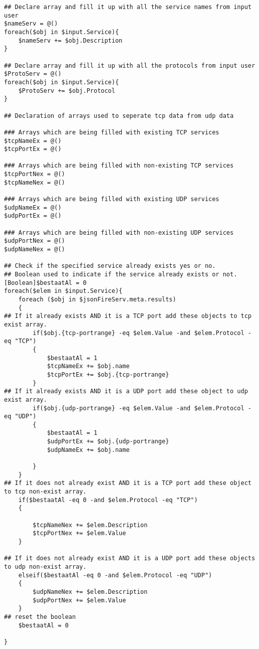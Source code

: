 \documentclass[dutch,dit,thesis]{hogentreport}
\begin{document}
\begin{lstlisting}[caption={main.ps1 Powershell script}]
## Declare array and fill it up with all the service names from input user
$nameServ = @()
foreach($obj in $input.Service){
    $nameServ += $obj.Description
}

## Declare array and fill it up with all the protocols from input user
$ProtoServ = @()
foreach($obj in $input.Service){
    $ProtoServ += $obj.Protocol
}

## Declaration of arrays used to seperate tcp data from udp data

### Arrays which are being filled with existing TCP services 
$tcpNameEx = @()
$tcpPortEx = @()

### Arrays which are being filled with non-existing TCP services
$tcpPortNex = @()
$tcpNameNex = @()

### Arrays which are being filled with existing UDP services
$udpNameEx = @()
$udpPortEx = @()

### Arrays which are being filled with non-existing UDP services
$udpPortNex = @()
$udpNameNex = @()

## Check if the specified service already exists yes or no. 
## Boolean used to indicate if the service already exists or not.
[Boolean]$bestaatAl = 0
foreach($elem in $input.Service){
    foreach ($obj in $jsonFireServ.meta.results)
    {
## If it already exists AND it is a TCP port add these objects to tcp exist array. 
        if($obj.{tcp-portrange} -eq $elem.Value -and $elem.Protocol -eq "TCP")
        {
            $bestaatAl = 1
            $tcpNameEx += $obj.name
            $tcpPortEx += $obj.{tcp-portrange}
        }
## If it already exists AND it is a UDP port add these object to udp exist array.
        if($obj.{udp-portrange} -eq $elem.Value -and $elem.Protocol -eq "UDP")
        {
            $bestaatAl = 1 
            $udpPortEx += $obj.{udp-portrange}
            $udpNameEx += $obj.name
            
        }
    }
## If it does not already exist AND it is a TCP port add these object to tcp non-exist array.
    if($bestaatAl -eq 0 -and $elem.Protocol -eq "TCP")
    {
      
        $tcpNameNex += $elem.Description
        $tcpPortNex += $elem.Value
    }

## If it does not already exist AND it is a UDP port add these objects to udp non-exist array.
    elseif($bestaatAl -eq 0 -and $elem.Protocol -eq "UDP")
    {
        $udpNameNex += $elem.Description
        $udpPortNex += $elem.Value
    }
## reset the boolean
    $bestaatAl = 0

}


\end{lstlisting}
\end{document}
